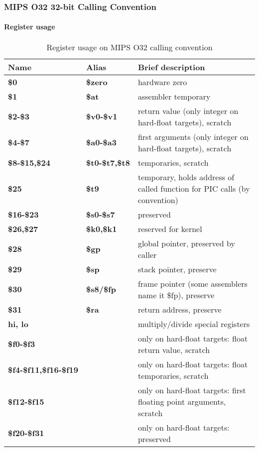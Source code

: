 \clearpage


\subsubsection{MIPS O32 32-bit Calling Convention}

\paragraph{Register usage}

\begin{table}[h]
\begin{tabular*}{0.95\textwidth}{lll}
Name                         & Alias                & Brief description\\
\hline                                                             
{\bf \$0}                    & {\bf \$zero}         & hardware zero \\
{\bf \$1}                    & {\bf \$at}           & assembler temporary \\
{\bf \$2-\$3}                & {\bf \$v0-\$v1}      & return value (only integer on hard-float targets), scratch \\
{\bf \$4-\$7}                & {\bf \$a0-\$a3}      & first arguments (only integer on hard-float targets), scratch\\
{\bf \$8-\$15,\$24}          & {\bf \$t0-\$t7,\$t8} & temporaries, scratch \\
{\bf \$25}                   & {\bf \$t9}           & temporary, holds address of called function for PIC calls (by convention) \\
{\bf \$16-\$23}              & {\bf \$s0-\$s7}      & preserved \\
{\bf \$26,\$27}              & {\bf \$k0,\$k1}      & reserved for kernel \\
{\bf \$28}                   & {\bf \$gp}           & global pointer, preserved by caller \\
{\bf \$29}                   & {\bf \$sp}           & stack pointer, preserve \\
{\bf \$30}                   & {\bf \$s8/\$fp}      & frame pointer (some assemblers name it \$fp), preserve \\
{\bf \$31}                   & {\bf \$ra}           & return address, preserve \\
{\bf hi, lo}                 &                      & multiply/divide special registers \\
{\bf \$f0-\$f3}              &                      & only on hard-float targets: float return value, scratch \\
{\bf \$f4-\$f11,\$f16-\$f19} &                      & only on hard-float targets: float temporaries, scratch \\
{\bf \$f12-\$f15}            &                      & only on hard-float targets: first floating point arguments, scratch \\
{\bf \$f20-\$f31}            &                      & only on hard-float targets: preserved \\
\end{tabular*}
\caption{Register usage on MIPS O32 calling convention}
\end{table}


